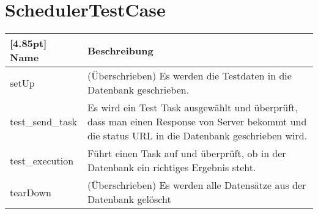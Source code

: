 	\section{SchedulerTestCase}
	
	\begin{center}
		\renewcommand{\arraystretch}{1.5}
		\setlength\tabcolsep{5pt}
		\begin{tabularx}{\textwidth}{|l|X|}
			\hline
			\rowcolor[gray]{0.75}[4.85pt]
			Name & Beschreibung \\ \hline
			setUp & (Überschrieben) \newline Es werden die Testdaten in die Datenbank geschrieben. \\ \hline
			test\_send\_task & Es wird ein Test Task ausgewählt und überprüft, dass man einen Response von Server bekommt und die status URL in die Datenbank geschrieben wird. \\ \hline
			test\_execution & Führt einen Task auf und überprüft, ob in der Datenbank ein richtiges Ergebnis steht. \\ \hline
			tearDown & (Überschrieben) \newline Es werden alle Datensätze aus der Datenbank gelöscht\\ \hline
		\end{tabularx}
	\end{center}
	
	
